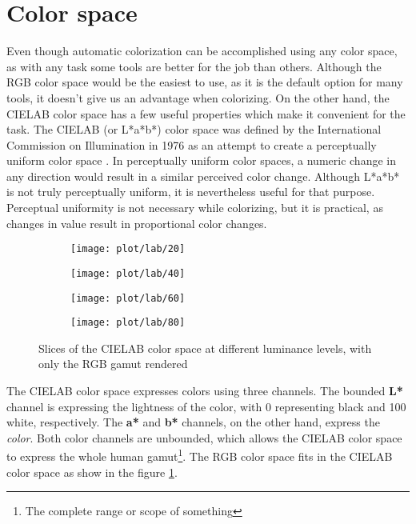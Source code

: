 \section{Color space}
\label{sec:colorspace}

Even though automatic colorization can be accomplished using any color space, 
as with any task some tools are better for the job than others. Although the 
RGB color space would be the easiest to use, as it is the default option for 
many tools, it doesn't give us an advantage when colorizing. On the other hand, 
the CIELAB color space has a few useful properties which make it convenient 
for the task. The CIELAB (or L*a*b*) color space was defined by the 
International Commission on Illumination in 1976 as an attempt to create a 
perceptually uniform color space \citep{icc2004cielab}. 
In perceptually uniform color spaces, a numeric change in any direction 
would result in a similar perceived color change. Although L*a*b* is not truly 
perceptually uniform, it is nevertheless useful for that purpose. Perceptual 
uniformity is not necessary while colorizing, but it is practical, as changes 
in value result in proportional color changes.

\begin{figure}[!h]
	\centering
	\begin{subfigure}{.24\textwidth}
		\centering
		\texttt{[image: plot/lab/20]}
	\end{subfigure}
	\begin{subfigure}{.24\textwidth}
		\centering
		\texttt{[image: plot/lab/40]}
	\end{subfigure}
	\begin{subfigure}{.24\textwidth}
		\centering
		\texttt{[image: plot/lab/60]}
	\end{subfigure}
	\begin{subfigure}{.24\textwidth}
		\centering
		\texttt{[image: plot/lab/80]}
	\end{subfigure}
    \caption{Slices of the CIELAB color space at different luminance levels, with only the RGB gamut rendered}
	\label{fig:rgb_in_lab}
\end{figure}

The CIELAB color space expresses colors using three channels. The bounded \textbf{L*}
channel is expressing the lightness of the color, with 0 representing black and 100 
white, respectively. The \textbf{a*} and \textbf{b*} channels, on the other hand, 
express the \textit{color}. Both color channels are unbounded, which allows the 
CIELAB color space to express the whole human gamut\footnote{The complete range 
or scope of something}. The RGB color space fits in the CIELAB color space 
as show in the figure \ref{fig:rgb_in_lab}.

